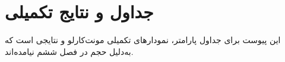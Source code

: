 \chapter{جداول و نتایج تکمیلی}
\label{app:extra-results}

این پیوست برای جداول پارامتر، نمودارهای تکمیلی مونت‌کارلو و نتایجی است که به‌دلیل حجم در فصل ششم نیامده‌اند.
